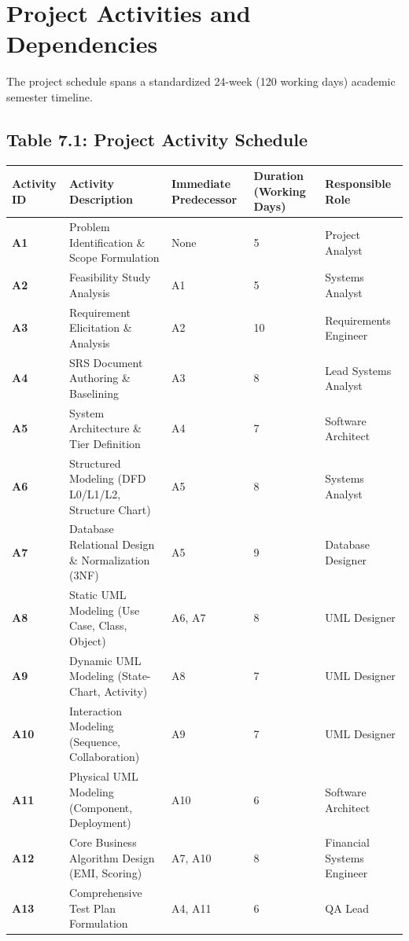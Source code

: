 \documentclass[12pt,a4paper,oneside]{report}
\begin{document}
\section{Project Activities and Dependencies}

The project schedule spans a standardized 24-week (120 working days) academic semester timeline.

\subsection{Table 7.1: Project Activity Schedule}

\begin{table}[htbp]
\centering
\small
\begin{tabularx}{\textwidth}{p{2.5cm} X X X X}
\toprule
\textbf{Activity ID} & \textbf{Activity Description} & \textbf{Immediate Predecessor} & \textbf{Duration (Working Days)} & \textbf{Responsible Role} \\
\midrule
\textbf{A1} & Problem Identification \& Scope Formulation & None & 5 & Project Analyst \\
\textbf{A2} & Feasibility Study Analysis & A1 & 5 & Systems Analyst \\
\textbf{A3} & Requirement Elicitation \& Analysis & A2 & 10 & Requirements Engineer \\
\textbf{A4} & SRS Document Authoring \& Baselining & A3 & 8 & Lead Systems Analyst \\
\textbf{A5} & System Architecture \& Tier Definition & A4 & 7 & Software Architect \\
\textbf{A6} & Structured Modeling (DFD L0/L1/L2, Structure Chart) & A5 & 8 & Systems Analyst \\
\textbf{A7} & Database Relational Design \& Normalization (3NF) & A5 & 9 & Database Designer \\
\textbf{A8} & Static UML Modeling (Use Case, Class, Object) & A6, A7 & 8 & UML Designer \\
\textbf{A9} & Dynamic UML Modeling (State-Chart, Activity) & A8 & 7 & UML Designer \\
\textbf{A10} & Interaction Modeling (Sequence, Collaboration) & A9 & 7 & UML Designer \\
\textbf{A11} & Physical UML Modeling (Component, Deployment) & A10 & 6 & Software Architect \\
\textbf{A12} & Core Business Algorithm Design (EMI, Scoring) & A7, A10 & 8 & Financial Systems Engineer \\
\textbf{A13} & Comprehensive Test Plan Formulation & A4, A11 & 6 & QA Lead \\

\end{tabularx}
\end{table}
\end{document}
